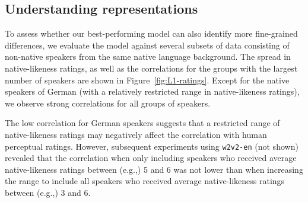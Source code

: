 \documentclass[11pt,a4paper]{article}
\begin{document}
\subsection{Understanding representations}

To assess whether our best-performing model can also identify more fine-grained differences, we evaluate the model against several subsets of data consisting of non-native speakers from the same native language background. 
The spread in native-likeness ratings, as well as the correlations for the groups with the largest number of speakers are shown in Figure~\ref{fig:L1-ratings}.
Except for the native speakers of German (with a relatively restricted range in native-likeness ratings), we observe strong correlations for all groups of speakers.

The low correlation for German speakers suggests that a restricted range of native-likeness ratings may negatively affect the correlation with human perceptual ratings. However, subsequent experiments using \texttt{w2v2-en} (not shown) revealed that the correlation when only including speakers who received average native-likeness ratings between (e.g.,) 5 and 6 was not lower than when increasing the range to include all speakers who received average native-likeness ratings between (e.g.,) 3 and 6. 

\end{document}
